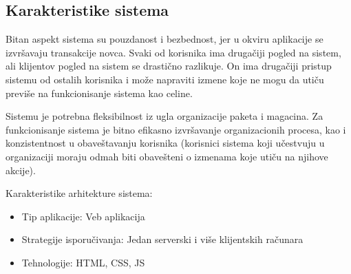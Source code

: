 \subsection{Karakteristike sistema}

Bitan aspekt sistema su pouzdanost i bezbednost, jer u okviru aplikacije se izvršavaju transakcije novca.
Svaki od korisnika ima drugačiji pogled na sistem, ali klijentov pogled na sistem se drastično razlikuje. On ima drugačiji pristup sistemu od ostalih korisnika i može napraviti izmene koje ne mogu da utiču previše na funkcionisanje sistema kao celine. 

Sistemu je potrebna fleksibilnost iz ugla organizacije paketa i magacina. Za funkcionisanje sistema je bitno efikasno izvršavanje organizacionih procesa, kao i konzistentnost u obaveštavanju korisnika (korisnici sistema koji učestvuju u organizaciji moraju odmah biti obavešteni o izmenama koje utiču na njihove akcije).

Karakteristike arhitekture sistema:
\begin{itemize}
    \item Tip aplikacije: Veb aplikacija
    \item Strategije isporučivanja: Jedan serverski i više klijentskih računara
    \item Tehnologije: HTML, CSS, JS
\end{itemize}

